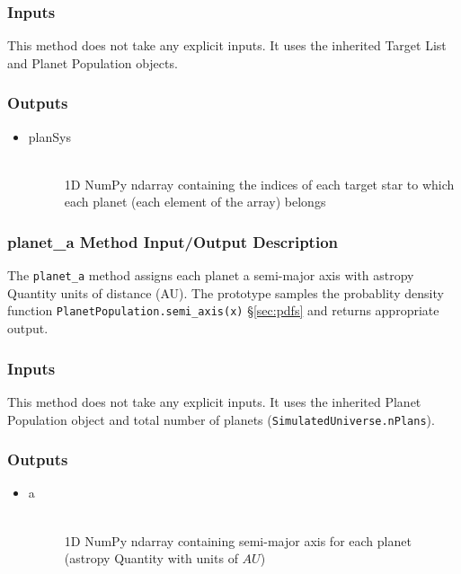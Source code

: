 \documentclass[cleanfoot]{asme2ej}
\begin{document}
\subsubsection*{Inputs}
This method does not take any explicit inputs.  It uses the inherited Target List and Planet Population objects.

\subsubsection*{Outputs}
\begin{itemize}
    \item 
    \begin{description}
        \item[planSys] \hfill \\
        1D NumPy ndarray containing the indices of each target star to which each planet (each element of the array) belongs
    \end{description}
\end{itemize}

\subsubsection{planet\_a Method Input/Output Description} \label{sec:planetatask}
The \verb+planet_a+ method assigns each planet a semi-major axis with astropy Quantity units of distance (AU).  The prototype samples the probablity density function \verb+PlanetPopulation.semi_axis(x)+ \S\ref{sec:pdfs} and returns appropriate output.

\subsubsection*{Inputs}
This method does not take any explicit inputs.  It uses the inherited Planet Population object and total number of planets (\verb+SimulatedUniverse.nPlans+).

\subsubsection*{Outputs}
\begin{itemize}
    \item 
    \begin{description}
        \item[a] \hfill \\
        1D NumPy ndarray containing semi-major axis for each planet (astropy Quantity with units of $ AU $)
    \end{description}
\end{itemize}
\end{document}
